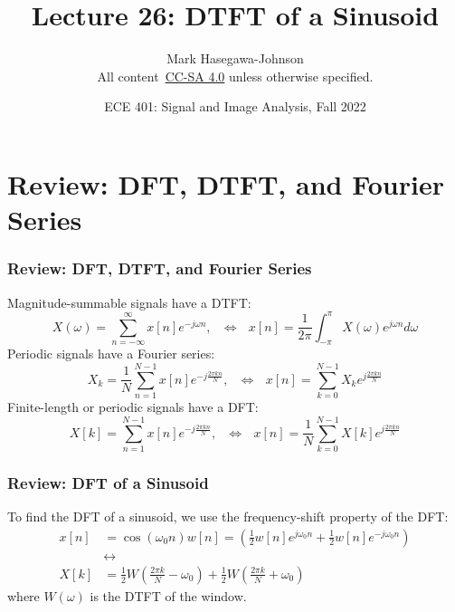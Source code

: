 \documentclass{beamer}
\title{Lecture 26: DTFT of a Sinusoid}
\author{Mark Hasegawa-Johnson\\All content~\href{https://creativecommons.org/licenses/by-sa/4.0/}{CC-SA 4.0} unless otherwise specified.}
\date{ECE 401: Signal and Image Analysis, Fall 2022}
\begin{document}
\begin{frame}
  \maketitle
\end{frame}

\begin{frame}
  \tableofcontents
\end{frame}

\section[Review]{Review: DFT, DTFT, and Fourier Series}
\setcounter{subsection}{1}

\begin{frame}
  \frametitle{Review: DFT, DTFT, and Fourier Series}

  Magnitude-summable signals have a DTFT:
  \begin{displaymath}
    X(\omega) = \sum_{n=-\infty}^\infty x[n]e^{-j\omega n},~~~\Leftrightarrow~~~
    x[n] = \frac{1}{2\pi}\int_{-\pi}^\pi X(\omega)e^{j\omega n}d\omega
  \end{displaymath}
  Periodic signals have a Fourier series:
  \begin{displaymath}
    X_k = \frac{1}{N}\sum_{n=1}^{N-1} x[n]e^{-j\frac{2\pi kn}{N}},~~~\Leftrightarrow~~~
    x[n] = \sum_{k=0}^{N-1} X_k e^{j\frac{2\pi kn}{N}}
  \end{displaymath}
  Finite-length or periodic signals have a DFT:
  \begin{displaymath}
    X[k] = \sum_{n=1}^{N-1} x[n]e^{-j\frac{2\pi kn}{N}},~~~\Leftrightarrow~~~
    x[n] = \frac{1}{N}\sum_{k=0}^{N-1} X[k] e^{j\frac{2\pi kn}{N}}
  \end{displaymath}
\end{frame}

\begin{frame}
  \frametitle{Review: DFT of a Sinusoid}

  To find the DFT of a sinusoid, we use the frequency-shift property
  of the DFT:
  \begin{align*}
    x[n]&=\cos(\omega_0 n)w[n] = 
    \left(\frac{1}{2}w[n]e^{j\omega_0 n}+\frac{1}{2}w[n]e^{-j\omega_0 n}\right)\\
    &\leftrightarrow\\
    X[k] &= \frac{1}{2}W\left(\frac{2\pi k}{N}-\omega_0\right) +
    \frac{1}{2}W\left(\frac{2\pi k}{N}+\omega_0\right)
  \end{align*}
  where $W(\omega)$ is the DTFT of the window.
\end{frame}
\end{document}
